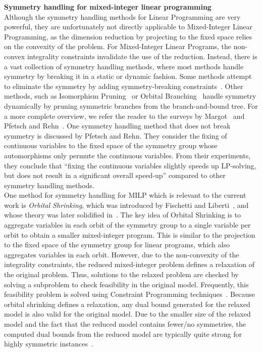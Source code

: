 \documentclass[pdflatex,sn-mathphys-num]{sn-jnl}%
\theoremstyle{thmstyleone}%
\theoremstyle{thmstylethree}%
\theoremstyle{thmstyletwo}%
\begin{document}
\noindent\textbf{Symmetry handling for mixed-integer linear programming}\\
Although the symmetry handling methods for Linear Programming are very powerful, they are unfortunately not directly applicable to Mixed-Integer Linear Programming, as the dimension reduction by projecting to the fixed space relies on the convexity of the problem. For Mixed-Integer Linear Programs, the non-convex integrality constraints invalidate the use of the reduction. Instead, there is a vast collection of symmetry handling methods, where most methods handle symmetry by breaking it in a static or dynamic fashion. Some methods attempt to eliminate the symmetry by adding symmetry-breaking constraints~\cite{Liberti2012,Liberti2014}. Other methods, such as Isomorphism Pruning~\cite{Margot2001,Margot2003} or Orbital Branching~\cite{Ostrowski2008,Ostrowski2011} handle symmetry dynamically by pruning symmetric branches from the branch-and-bound tree.
For a more complete overview, we refer the reader to the surveys by Margot~\cite{Margot2010} and Pfetsch and Rehn~\cite{Pfetsch2019}.
One symmetry handling method that does not break symmetry is discussed by Pfetsch and Rehn. They consider the fixing of continuous variables to the fixed space of the symmetry group whose automorphisms only permute the continuous variables. From their experiments, they conclude that ``fixing the continuous variables slightly speeds up LP-solving, but does not result in a significant overall speed-up'' compared to other symmetry handling methods. \\

One method for symmetry handling for MILP which is relevant to the current work is \emph{Orbital Shrinking}, which was introduced by Fischetti and Liberti~\cite{Fischetti2012}, and whose theory was later solidified in~\cite{Fischetti2017}. The key idea of Orbital Shrinking is to aggregate variables in each orbit of the symmetry group to a single variable per orbit to obtain a smaller mixed-integer program. This is similar to the projection to the fixed space of the symmetry group for linear programs, which also aggregates variables in each orbit. However, due to the non-convexity of the integrality constraints, the reduced mixed-integer problem defines a relaxation of the original problem. Thus, solutions to the relaxed problem are checked by solving a subproblem to check feasibility in the original model. Frequently, this feasibility problem is solved using Constraint Programming techniques~\cite{ Salvagnin2013,Salvagnin2012}. Because orbital shrinking defines a relaxation, any dual bound generated for the relaxed model is also valid for the original model. Due to the smaller size of the relaxed model and the fact that the reduced model contains fewer/no symmetries, the computed dual bounds from the reduced model are typically quite strong for highly symmetric instances~\cite{Salvagnin2013,Salvagnin2012}.
\end{document}
